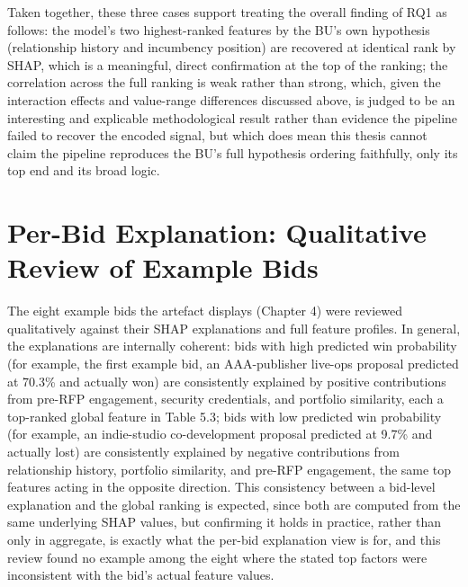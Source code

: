 \documentclass[12pt,oneside]{report}
\begin{document}
Taken together, these three cases support treating the overall finding
of RQ1 as follows: the model's two highest-ranked features by the BU's
own hypothesis (relationship history and incumbency position) are
recovered at identical rank by SHAP, which is a meaningful, direct
confirmation at the top of the ranking; the correlation across the full
ranking is weak rather than strong, which, given the interaction effects
and value-range differences discussed above, is judged to be an
interesting and explicable methodological result rather than evidence
the pipeline failed to recover the encoded signal, but which does mean
this thesis cannot claim the pipeline reproduces the BU's full
hypothesis ordering faithfully, only its top end and its broad logic.

\hypertarget{per-bid-explanation-qualitative-review-of-example-bids}{%
\section{Per-Bid Explanation: Qualitative Review of Example
Bids}\label{per-bid-explanation-qualitative-review-of-example-bids}}

The eight example bids the artefact displays (Chapter 4) were reviewed
qualitatively against their SHAP explanations and full feature profiles.
In general, the explanations are internally coherent: bids with high
predicted win probability (for example, the first example bid, an
AAA-publisher live-ops proposal predicted at 70.3\% and actually won)
are consistently explained by positive contributions from pre-RFP
engagement, security credentials, and portfolio similarity, each a
top-ranked global feature in Table 5.3; bids with low predicted win
probability (for example, an indie-studio co-development proposal
predicted at 9.7\% and actually lost) are consistently explained by
negative contributions from relationship history, portfolio similarity,
and pre-RFP engagement, the same top features acting in the opposite
direction. This consistency between a bid-level explanation and the
global ranking is expected, since both are computed from the same
underlying SHAP values, but confirming it holds in practice, rather than
only in aggregate, is exactly what the per-bid explanation view is for,
and this review found no example among the eight where the stated top
factors were inconsistent with the bid's actual feature values.
\end{document}

